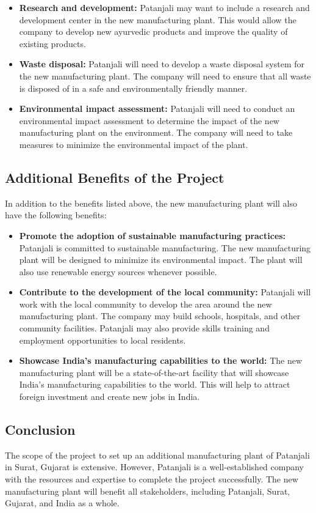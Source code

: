 \begin{itemize}
    \item \textbf{Research and development:} Patanjali may want to include a research and development center in the new manufacturing plant. This would allow the company to develop new ayurvedic products and improve the quality of existing products.
    \item \textbf{Waste disposal:} Patanjali will need to develop a waste disposal system for the new manufacturing plant. The company will need to ensure that all waste is disposed of in a safe and environmentally friendly manner.
    \item \textbf{Environmental impact assessment:} Patanjali will need to conduct an environmental impact assessment to determine the impact of the new manufacturing plant on the environment. The company will need to take measures to minimize the environmental impact of the plant.
\end{itemize}

\subsection{Additional Benefits of the Project}
In addition to the benefits listed above, the new manufacturing plant will also have the following benefits:

\begin{itemize}
    \item \textbf{Promote the adoption of sustainable manufacturing practices:} Patanjali is committed to sustainable manufacturing. The new manufacturing plant will be designed to minimize its environmental impact. The plant will also use renewable energy sources whenever possible.
    \item \textbf{Contribute to the development of the local community:} Patanjali will work with the local community to develop the area around the new manufacturing plant. The company may build schools, hospitals, and other community facilities. Patanjali may also provide skills training and employment opportunities to local residents.
    \item \textbf{Showcase India's manufacturing capabilities to the world:} The new manufacturing plant will be a state-of-the-art facility that will showcase India's manufacturing capabilities to the world. This will help to attract foreign investment and create new jobs in India.
\end{itemize}

\subsection{Conclusion}
The scope of the project to set up an additional manufacturing plant of Patanjali in Surat, Gujarat is extensive. However, Patanjali is a well-established company with the resources and expertise to complete the project successfully. The new manufacturing plant will benefit all stakeholders, including Patanjali, Surat, Gujarat, and India as a whole.



